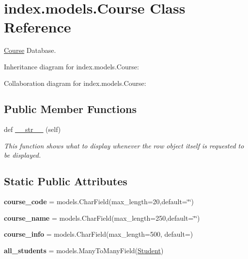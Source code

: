 \hypertarget{classindex_1_1models_1_1Course}{}\section{index.\+models.\+Course Class Reference}
\label{classindex_1_1models_1_1Course}


\hyperlink{classindex_1_1models_1_1Course}{Course} Database.  




Inheritance diagram for index.\+models.\+Course\+:


Collaboration diagram for index.\+models.\+Course\+:
\subsection*{Public Member Functions}
\begin{DoxyCompactItemize}
\item 
def \hyperlink{classindex_1_1models_1_1Course_a08db1a3c950dbeaa61e2b0b1c200d4de}{\+\_\+\+\_\+str\+\_\+\+\_\+} (self)
\begin{DoxyCompactList}\small\item\em This function shows what to display whenever the row object itself is requested to be displayed. \end{DoxyCompactList}\end{DoxyCompactItemize}
\subsection*{Static Public Attributes}
\begin{DoxyCompactItemize}
\item 
\mbox{\label{classindex_1_1models_1_1Course_aeab76f6a9a81750b219143c8db2153a9}} 
{\bfseries course\+\_\+code} = models.\+Char\+Field(max\+\_\+length=20,default=\char`\"{}\char`\"{})
\item 
\mbox{\label{classindex_1_1models_1_1Course_a018da7073e5b2f815e2329d7bd18d737}} 
{\bfseries course\+\_\+name} = models.\+Char\+Field(max\+\_\+length=250,default=\char`\"{}\char`\"{})
\item 
\mbox{\label{classindex_1_1models_1_1Course_af550a855d0d8620b2091bcdc7557de1b}} 
{\bfseries course\+\_\+info} = models.\+Char\+Field(max\+\_\+length=500, default=\textquotesingle{}\textquotesingle{})
\item 
\mbox{\label{classindex_1_1models_1_1Course_af8449d1aa5a8eeabd0cebb1b6524df77}} 
{\bfseries all\+\_\+students} = models.\+Many\+To\+Many\+Field(\hyperlink{classindex_1_1models_1_1Student}{Student})
\end{DoxyCompactItemize}


